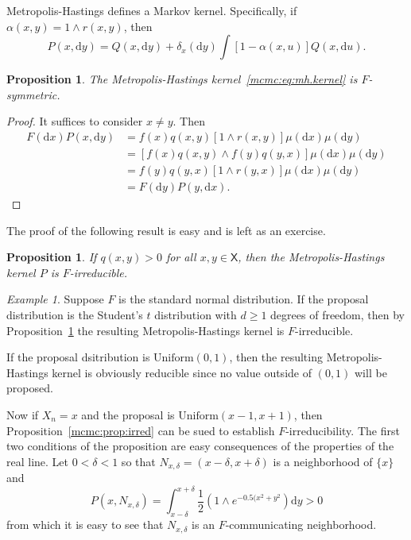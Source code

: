 \documentclass[12pt]{article}
\theoremstyle{plain}
\newtheorem{prop}[thm]{Proposition}
\theoremstyle{definition}
\theoremstyle{remark}
\newtheorem{example}{Example}[section]
\newcommand{\df}{\mathrm{d}}
\newcommand{\X}{\mathsf{X}}
\begin{document}
Metropolis-Hastings defines a Markov kernel.  Specifically, if
$\alpha(x, y) = 1 \wedge r(x,y)$, then 
\begin{equation}
  \label{mcmc:eq:mh.kernel}
  P(x, \df y) = Q(x, \df y) + \delta_x(\df y) \int \left[ 1 -
    \alpha(x, u) \right] Q(x, \df u) .
\end{equation}

\begin{prop}
  \label{mcmc:prop:mh.symmetric}
  The Metropolis-Hastings kernel~\eqref{mcmc:eq:mh.kernel} is $F$-symmetric.
\end{prop}

\begin{proof}
  It suffices to consider $x \neq y$.  Then
  \begin{align*}
    F(\df x) P(x, \df y) & = f(x) q(x, y) \left[ 1 \wedge r(x, y)
                           \right] \mu(\df x) \mu(\df y) \\
    &  = \left[ f(x) q(x, y) \wedge f(y) q(y, x) \right] \mu(\df x)
      \mu(\df y) \\
    & = f(y) q(y, x) \left[ 1 \wedge r(y,x) \right] \mu(\df x) \mu(\df
      y) \\
    & = F(\df y) P(y, \df x) .
    \end{align*}
  \end{proof}

  The proof of the following result is easy and is left as
  an exercise.

\begin{prop}
 \label{mcmc:prop:mh.irreducible}
If $q(x, y) > 0$ for all $x,y \in \X$, then the Metropolis-Hastings
kernel $P$ is $F$-irreducible.
\end{prop}

\begin{example}
  Suppose $F$ is the standard normal distribution.  If the proposal
  distribution is the Student's $t$ distribution with $d \ge 1$
  degrees of freedom, then by
  Proposition~\ref{mcmc:prop:mh.irreducible} the resulting
  Metropolis-Hastings kernel is $F$-irreducible.

  If the proposal dsitribution is $\text{Uniform}(0,1)$, then the
  resulting Metropolis-Hastings kernel is obviously reducible since no
  value outside of $(0,1)$ will be proposed.

  Now if $X_n = x$ and the proposal is $\text{Uniform}(x -1,
  x+1)$, then Proposition~\ref{mcmc:prop:irred} can be sued to
  establish $F$-irreducibility.  The first two conditions of the
  proposition are easy consequences of the properties of the real
  line.  Let $0 < \delta < 1$ so that $N_{x, \delta} = (x - \delta, x + \delta)$ is a
  neighborhood of $\{ x\}$ and
  \[
P(x, N_{x, \delta}) = \int_{x-\delta}^{x+\delta} \frac{1}{2} \left( 1 \wedge
e^{-0.5(x^2 + y^2} \right) \df y > 0
\]
from which it is easy to see that $N_{x,\delta}$ is an $F$-communicating neighborhood.
\end{example}
\end{document}
